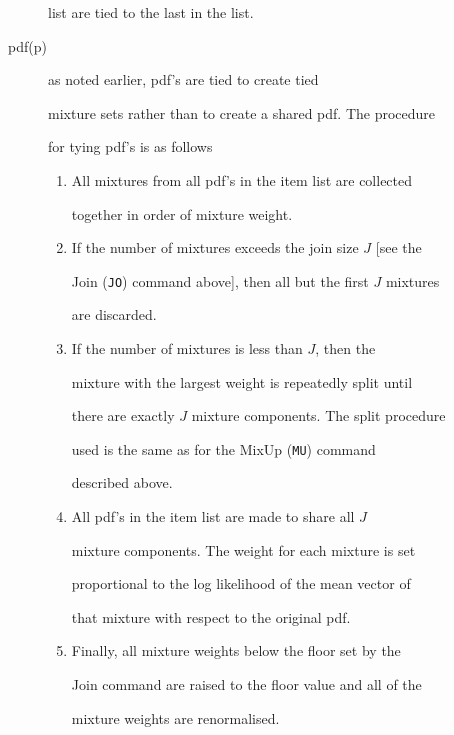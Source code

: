 \begin{description}
   list are tied to the last in the list.


   \item[pdf(p)]  as noted earlier, pdf's are tied to create tied


   mixture sets rather than to create a shared pdf.  The procedure


   for tying pdf's is as follows


   \begin{enumerate}


      \item All mixtures from all pdf's in the item list are collected 


       together in order of mixture weight.


      \item If the number of mixtures exceeds the join size $J$ [see the


       Join (\texttt{JO}) command above], then all but the first $J$ mixtures


       are discarded.


      \item If the number of mixtures is less than $J$, then the


       mixture with the largest weight is repeatedly split until


       there are exactly $J$ mixture components.  The split procedure


       used is the same as for the MixUp (\texttt{MU}) command


       described above.


      \item All pdf's in the item list are made to share all $J$


       mixture components.  The weight for each mixture is set


       proportional to the log likelihood of the mean vector of


       that mixture with respect to the original pdf.      


      \item Finally, all mixture weights below the floor set by the


       Join command are raised to the floor value and all of the


       mixture weights are renormalised.


   \end{enumerate}


\end{description}





